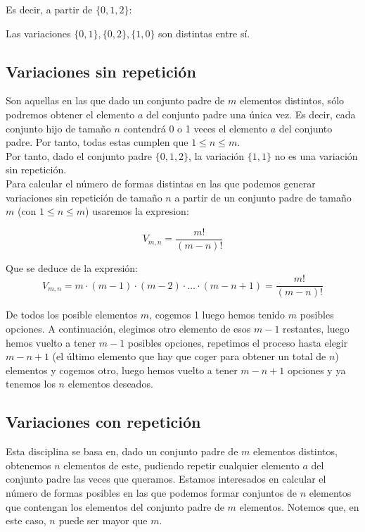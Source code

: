 Es decir, a partir de $\{0, 1, 2\}$:

Las variaciones $\{0, 1\}, \{0, 2\}, \{1, 0\}$ son distintas entre sí.

\subsection{Variaciones sin repetición}

Son aquellas en las que dado un conjunto padre de $m$ elementos distintos, sólo podremos obtener el elemento $a$
del conjunto padre una única vez. Es decir, cada conjunto hijo de tamaño $n$ contendrá 0 o 1 veces el elemento
$a$ del conjunto padre. Por tanto, todas estas cumplen que $1 \leq n \leq m$.\\


Por tanto, dado el conjunto padre $\{0, 1, 2\}$, la variación $\{1, 1\}$ no es una variación sin repetición.\\


Para calcular el número de formas distintas en las que podemos generar variaciones sin repetición de tamaño
$n$ a partir de un conjunto padre de tamaño $m$ (con $1 \leq n \leq m$) usaremos la expresion:

$$V_{m, n} = \dfrac{m!}{(m-n)!}$$


Que se deduce de la expresión:
$$V_{m, n} = m \cdot (m-1) \cdot (m-2) \cdot \ldots \cdot (m-n+1) = \dfrac{m!}{(m-n)!}$$


De todos los posible elementos $m$, cogemos 1 luego hemos tenido $m$ posibles opciones. A continuación,
elegimos otro elemento de esos $m-1$ restantes, luego hemos vuelto a tener $m-1$ posibles opciones, repetimos
el proceso hasta elegir $m-n+1$ (el último elemento que hay que coger para obtener un total de $n$) elementos
y cogemos otro, luego hemos vuelto a tener $m-n+1$ opciones y ya tenemos los $n$ elementos deseados.

\subsection{Variaciones con repetición}

Esta disciplina se basa en, dado un conjunto padre de $m$ elementos distintos, obtenemos $n$ elementos de
este, pudiendo repetir cualquier elemento $a$ del conjunto padre las veces que queramos. Estamos interesados
en calcular el número de formas posibles en las que podemos formar conjuntos de $n$ elementos que contengan
los elementos del conjunto padre de $m$ elementos. Notemos que, en este caso, $n$ puede ser mayor que $m$.\\


